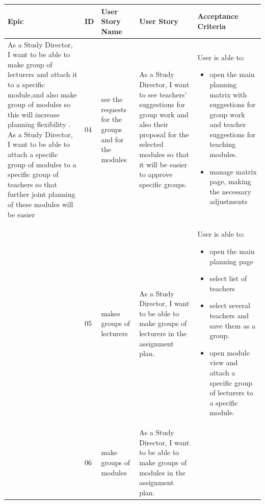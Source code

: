 \documentclass{scrartcl}
\begin{document}
\begin{table}[H]
\begin{center}
\begin{tabular}{|p{4cm}|p{0.5cm} |p{3cm}|p{4cm}|p{4cm}|}\hline
\rowcolor{LightCyan}
 \textbf{Epic} &\textbf{ ID} &\textbf{User Story Name} &\textbf{User Story}  & \textbf{Acceptance Criteria} \\
\hline
   
 As a Study Director, I want to be able to make group of lecturers and attach it to a specific module,and also make group of modules so this will increase planning flexibility . As a Study Director, I want to be able to attach a specific group of modules to a specific group of teachers so that further joint planning of these modules will be easier &
04 &
see the requests for the groups and for the modules &
As a Study Director, I want to see teachers' suggestions for group work and also their proposal for the selected modules so that it will be easier to approve specific groups. &
          
  User is able to:            
\begin{itemize}
\item open the main planning matrix with suggestions for group work and teacher suggestions for teaching modules.
\item manage matrix page, making the necessary adjustments

\end{itemize}                                                                 \\ \hline

 &
 05&
 makes groups of lecturers&
 As a Study Director, I want to be able to make groups of lecturers in the assignment plan. &
 
   User is able to:            
\begin{itemize}
\item open the main planning page
\item select list of teachers
\item select several teachers and save them as a group.
\item open module view and attach a specific group of lecturers to a specific module.

\end{itemize}                                                                 \\ \hline

 &
 06&
 make groups of modules&
 As a Study Director, I want to be able to make groups of modules in the assignment plan. &
 

\end{tabular}
\end{center}
\end{table}
\end{document}
